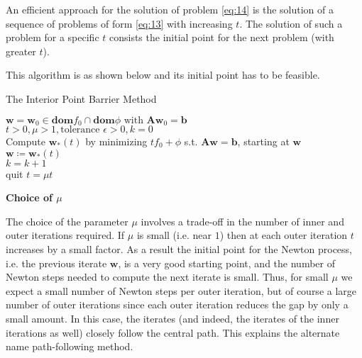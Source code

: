 \documentclass{beamer}
\begin{document}
\begin{frame}

\justifying
An efficient approach for the solution of problem \eqref{eq:14} is the solution of a sequence of problems of form \eqref{eq:13} with increasing $t$. The solution of such a problem for a specific $t$ consists the initial point for the next problem (with greater $t$).

\vspace{0.4cm}
\justifying
This algorithm is as shown below and its initial point has to be feasible.

\justifying
\begin{algorithm}[H]
			\caption{The Interior Point Barrier Method}\label{alg:2}
			$\mathbf{w} = \mathbf{w}_{0} \in \textbf{dom}f_{0} \cap \textbf{dom}\phi \text{ with } \mathbf{A}\mathbf{w}_{0} = \mathbf{b}$\\
			$t > 0, \mu > 1, \text{tolerance } \epsilon > 0, k = 0$\\
			{
				Compute $\mathbf{w}_{*}\left(t\right)$ by minimizing $t f_{0} + \phi$ s.t. $\mathbf{A}\mathbf{w} = \mathbf{b}$, starting at $\mathbf{w}$\\
				$\mathbf{w} \coloneqq \mathbf{w}_{*}\left(t\right)$\\
				$k = k+1$\\
				{
					quit
				}
				$t = \mu t$\\
			}
\end{algorithm}

\end{frame}


\begin{frame}

\textbf{Choice of $\mu$}

\vspace{0.4cm}
\justifying
The choice of the parameter $\mu$ involves a trade-off in the number of inner and outer iterations required. If $\mu$ is small (i.e. near $1$) then at each outer iteration $t$ increases by a small factor. As a result the initial point for the Newton process, i.e. the previous iterate $\mathbf{w}$, is a very good starting point, and the number of Newton steps needed to compute the next iterate is small. Thus, for small $\mu$ we expect a small number of Newton steps per outer iteration, but of course a large number of outer iterations since each outer iteration reduces the gap by only a small amount. In this case, the iterates (and indeed, the iterates of the inner iterations as well) closely follow the central path. This explains the alternate name path-following method.

\end{frame}
\end{document}
